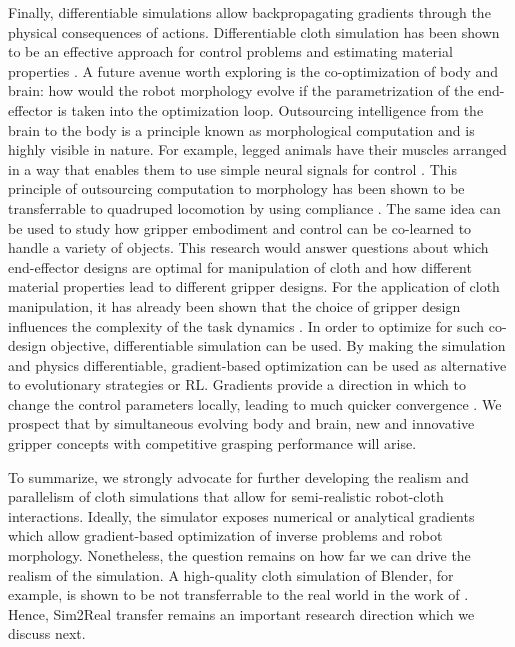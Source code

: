 \documentclass[\home/main.tex]{subfiles}
\begin{document}
Finally, differentiable simulations allow backpropagating gradients through the physical consequences of actions. Differentiable cloth simulation has been shown to be an effective approach for control problems and estimating material properties \autocite{Junbang2019,li2021diffcloth}.
A future avenue worth exploring is the co-optimization of body and brain: how would the robot morphology evolve if the parametrization of the end-effector is taken into the optimization loop. Outsourcing intelligence from the brain to the body is a principle known as morphological computation \autocite{Rolf2006} and is highly visible in nature. For example, legged animals have their muscles arranged in a way that enables them to use simple neural signals for control \autocite{MacKay-Lyons2002}. 
This principle of outsourcing computation to morphology has been shown to be transferrable to quadruped locomotion by using compliance \autocite{Urbain2021}. The same idea can be used to study how gripper embodiment and control can be co-learned to handle a variety of objects. This research would answer questions about which end-effector designs are optimal for manipulation of cloth and how different material properties lead to different gripper designs. For the application of cloth manipulation, it has already been shown that the choice of gripper design influences the complexity of the task dynamics \autocite{Borras2020}. In order to optimize for such co-design objective, differentiable simulation can be used. By making the simulation and physics differentiable, gradient-based optimization can be used as alternative to evolutionary strategies or \gls{RL}. Gradients provide a direction in which to change the control parameters locally, leading to much quicker convergence \autocite{Degrave2019, li2021diffcloth}.
We prospect that by simultaneous evolving body and brain, new and innovative gripper concepts with competitive grasping performance will arise. 

To summarize, we strongly advocate for further developing the realism and parallelism of cloth simulations that allow for semi-realistic robot-cloth interactions. Ideally, the simulator exposes numerical or analytical gradients which allow gradient-based optimization of inverse problems and robot morphology. Nonetheless, the question remains on how far we can drive the realism of the simulation. A high-quality cloth simulation of Blender, for example, is shown to be not transferrable to the real world in the work of \autocite{Tanaka2018}. Hence, Sim2Real transfer remains an important research direction which we discuss next. 
\end{document}
